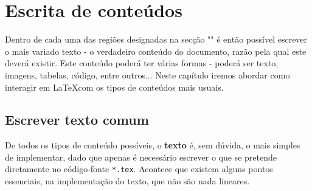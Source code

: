 \documentclass[a4paper, onecolumn, 10pt]{report}
\begin{document}
\chapter{Escrita de conteúdos}
Dentro de cada uma das regiões designadas na secção "" é então possível escrever o mais variado texto - o verdadeiro conteúdo do
documento, razão pela qual este deverá existir. Este conteúdo poderá ter várias formas - poderá ser texto, imagens, tabelas, código, entre outros... Neste
capítulo iremos abordar como interagir em \LaTeX com os tipos de conteúdos mais usuais.

\section{Escrever texto comum}
De todos os tipos de conteúdo possíveis, o \textbf{texto} é, sem dúvida, o mais simples de implementar, dado que apenas é necessário escrever o que se
pretende diretamente no código-fonte \texttt{*.tex}. Acontece que existem alguns pontos essenciais, na implementação do texto, que não são nada lineares. \\
\end{document}
